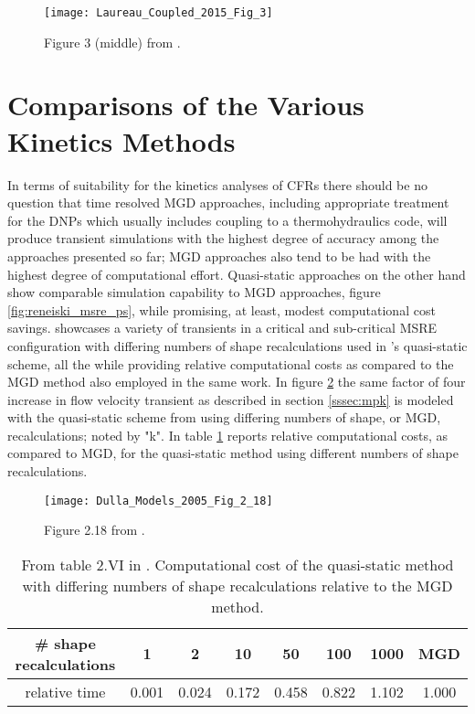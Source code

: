 \documentclass[review]{elsarticle}
\begin{document}
\begin{figure}[h]
   \centering
   \texttt{[image: Laureau\_Coupled\_2015\_Fig\_3]}
   \caption{Figure 3 (middle) from \cite{laureau_coupled_2015}.} 
   \label{fig:laureau_msfr}
\end{figure}

\section{Comparisons of the Various Kinetics Methods}
\label{sec:comp}
In terms of suitability for the kinetics analyses of CFRs there should be no
question that time resolved MGD approaches, including appropriate treatment
for the DNPs which usually includes coupling to a thermohydraulics code, will
produce transient simulations with the highest degree of accuracy among the
approaches presented so far; MGD approaches also tend to be had with the highest
degree of computational effort. Quasi-static approaches on the other hand
show comparable simulation capability to MGD approaches, 
figure \ref{fig:reneiski_msre_ps},  while promising, at
least, modest computational cost savings. \cite{dulla_models_2005} showcases
a variety of transients in a critical and sub-critical MSRE configuration with
differing numbers of shape recalculations used in \cite{dulla_models_2005}'s
quasi-static scheme, all the while providing relative computational costs
 as compared to the MGD method
also employed in the same work. In figure \ref{fig:dulla_4x_qs} the same factor
of four increase in flow velocity transient as described in section
\ref{sssec:mpk} is modeled with the quasi-static scheme from
\cite{dulla_models_2005} using differing numbers of shape, or MGD,
recalculations; noted by "k". In table \ref{tbl:dulla_costs}
\cite{dulla_models_2005} reports relative computational costs, as compared to
MGD, for the quasi-static method using different numbers of shape recalculations.


\begin{figure}[h]
   \centering
   \texttt{[image: Dulla\_Models\_2005\_Fig\_2\_18]}
   \caption{Figure 2.18 from \cite{dulla_models_2005}.} 
   \label{fig:dulla_4x_qs}
\end{figure}

\begin{table}[h]
    \caption{From table 2.VI in \cite{dulla_models_2005}. Computational cost
        of the quasi-static method with differing numbers of shape
        recalculations relative to the MGD method.}
    \label{tbl:dulla_costs}
    \begin{center}
        \begin{tabular}{|c|c|c|c|c|c|c|c|}
            \hline
            \# shape recalculations & 1 & 2 & 10 & 50 & 100 & 1000 & MGD \\
            \hline
            relative time & 0.001 & 0.024 & 0.172 & 0.458 & 0.822 & 1.102 &
                1.000 \\
            \hline
        \end{tabular}
    \end{center}
\end{table}
\end{document}
